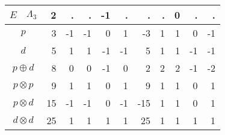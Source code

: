 \documentclass[twocolumn,showpacs,preprintnumbers,superscriptaddress,prb,floatfix,aps,10pt]{revtex4-1}
\begin{document}
\begin{table}
\begin{ruledtabular}
\begin{tabular*}{10cm}{llrrrrrrrrrr}
$E$             & $\Lambda_{3} $  &  2  &     .  &     .  &    -1  &     .  &   .  &          .  &          0  &          .  &          .  \\ \hline
\multicolumn{2}{c}{$p$          } &  3  &     -1 &    -1  &     0  &     1  &  -3  &          1  &          1  &          0  &         -1  \\
\multicolumn{2}{c}{$d$          } &  5  &      1 &     1  &    -1  &    -1  &   5  &          1  &          1  &         -1  &         -1  \\
\multicolumn{2}{c}{$p \oplus  d$} &  8  &      0 &     0  &    -1  &     0  &   2  &          2  &          2  &         -1  &         -2  \\
\multicolumn{2}{c}{$p \otimes p$} &  9  &      1 &     1  &     0  &     1  &   9  &          1  &          1  &          0  &          1  \\
\multicolumn{2}{c}{$p \otimes d$} & 15  &     -1 &    -1  &     0  &    -1  & -15  &          1  &          1  &          0  &          1  \\
\multicolumn{2}{c}{$d \otimes d$} & 25  &      1 &     1  &     1  &     1  &  25  &          1  &          1  &          1  &          1  \\
\end{tabular*}
\end{ruledtabular}
\end{table}
\end{document}
